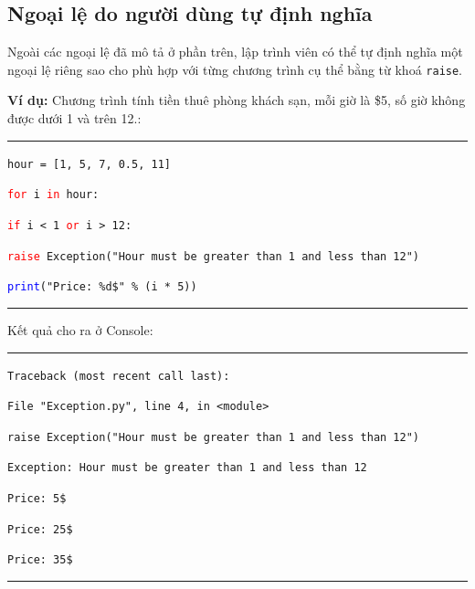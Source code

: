 \subsection{Ngoại lệ do người dùng tự định nghĩa}
Ngoài các ngoại lệ đã mô tả ở phần trên, lập trình viên có thể tự định nghĩa một ngoại lệ riêng sao cho phù hợp với từng chương trình cụ thể bằng từ khoá \texttt{raise}.\par
\textbf{Ví dụ:} Chương trình tính tiền thuê phòng khách sạn, mỗi giờ là \$5, số giờ không được dưới 1 và trên 12.:\\
\rule{\linewidth}{0.2mm}\par
\begin{linenumbers}
	\texttt{hour = [1, 5, 7, 0.5, 11]}\par
	\texttt{\textcolor{red}{for} i \textcolor{red}{in} hour:}\par
	\qquad\texttt{\textcolor{red}{if} i < 1 \textcolor{red}{or} i > 12:}\par
	\qquad\qquad\texttt{\textcolor{red}{raise} Exception("Hour must be greater than 1 and less than 12")}\par
	\qquad\texttt{\textcolor{blue}{print}("Price: \%d\$" \% (i * 5))}\par
\end{linenumbers}
\rule{\linewidth}{0.2mm}\par
\noindent
\resetlinenumber
Kết quả cho ra ở Console:\\
\rule{\linewidth}{0.2mm}\par
\begin{linenumbers}
	\texttt{Traceback (most recent call last):}\par
	\texttt{File "Exception.py", line 4, in <module>}\par
	\qquad\texttt{raise Exception("Hour must be greater than 1 and less than 12")}\par
	\texttt{Exception: Hour must be greater than 1 and less than 12}\par
	\texttt{Price: 5\$}\par
	\texttt{Price: 25\$}\par
	\texttt{Price: 35\$}\par
\end{linenumbers}
\rule{\linewidth}{0.2mm}\par
\resetlinenumber